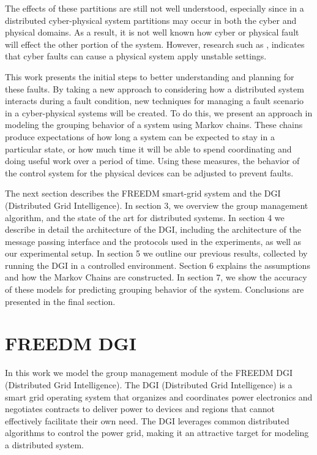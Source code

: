 The effects of these partitions are still not well understood, especially since in a distributed
cyber-physical system partitions may occur in both the cyber and physical domains. As a result,
it is not well known how cyber or physical fault will effect the other portion of the system.
However, research such as \cite{HARINI}\cite{TSG}, indicates that cyber faults can cause a
physical system apply unstable settings.

This work presents the initial steps to better understanding and planning for these faults.
By taking a new approach to considering how a distributed system interacts during a fault condition,
new techniques for managing a fault scenario in a cyber-physical systems will be created. To do
this, we present an approach in modeling the grouping behavior of a system using Markov chains.
These chains produce expectations of how long a system can be expected to stay in a particular
state, or how much time it will be able to spend coordinating and doing useful work over a period
of time. Using these measures, the behavior of the control system for the physical devices 
can be adjusted to prevent faults.

The next section describes the FREEDM smart-grid system and the DGI (Distributed Grid Intelligence). In section 3,
we overview the group management algorithm, and the state of the art for distributed
systems. In section 4 we describe in detail the architecture of the DGI, including the architecture
of the message passing interface and the protocols used in the experiments, as well as our
experimental setup. In section 5 we outline our previous results, collected by running the DGI
in a controlled environment. Section 6 explains the assumptions and how the Markov Chains are
constructed. In section 7, we show the accuracy of these models for predicting grouping behavior
of the system. Conclusions are presented in the final section.

\section{FREEDM DGI}
In this work we model the group management module of the FREEDM DGI (Distributed Grid Intelligence).
The DGI (Distributed Grid Intelligence) is a smart grid operating system
that organizes and coordinates power electronics and negotiates contracts to
deliver power to devices and regions that cannot effectively facilitate their own need.
The DGI leverages common distributed algorithms to control the power grid, making it an
attractive target for modeling a distributed system.

